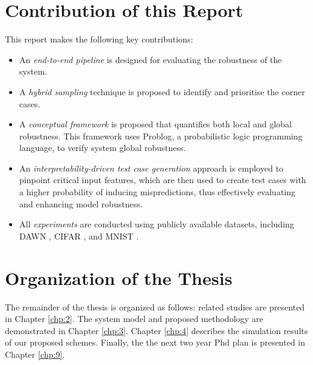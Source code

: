 \section{Contribution of this Report}


This report makes the following key contributions: %

\begin{itemize}
    \item An \textit{end-to-end pipeline} is designed for evaluating the robustness of the system.
    \item A \textit{hybrid sampling} technique is proposed to identify and prioritise the corner cases.
    \item A \textit{conceptual framework} is proposed that quantifies both local and global robustness. This framework uses Problog, a probabilistic logic programming language, to verify system global robustness.
    \item An \textit{interpretability-driven test case generation} approach is employed to pinpoint critical input features, which are then used to create test cases with a higher probability of inducing mispredictions, thus effectively evaluating and enhancing model robustness.
    \item All \textit{experiments} are conducted using publicly available datasets, including DAWN \cite{DAWN}, CIFAR \cite{CIFAR10}, and MNIST \cite{MNIST}.
\end{itemize}

\begin{center}
    \end{center}
\section{Organization of the Thesis}\hypertarget{organization of thesis}{}
The remainder of the thesis is organized as follows: related studies are presented in Chapter \ref{chp:2}. The system model and proposed methodology are demonstrated in Chapter \ref{chp:3}. Chapter \ref{chp:4} describes the simulation results of our proposed schemes. Finally, the the next two year Phd plan is presented in Chapter \ref{chp:9}.


\clearpage
